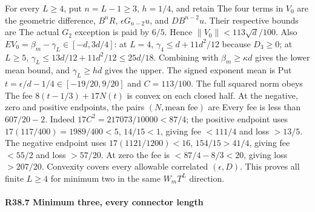 For every \(L\ge4\), put \(n=L-1\ge3\), \(h=1/4\), and retain
The four terms in \(V_0\) are the geometric difference, \(B^nR\), \(\epsilon G_{n-2}u\), and \(DB^{n-2}u\). Their respective bounds are
The actual \(G_2\) exception is paid by \(6/5\). Hence \(\|V_0\|<113\sqrt d/100\). Also \(EV_0=\beta_m-\gamma_L\in[-d,\allowbreak 3d/4]\): at \(L=4\), \(\gamma_4\le d+11d^2/12\) because \(D_3\ge0\); at \(L\ge5\), \(\gamma_L\le13d/12+11d^2/12\le25d/18\). Combining with \(\beta_m\ge\kappa d\) gives the lower mean bound, and \(\gamma_L\ge hd\) gives the upper. The signed exponent mean is
Put \(t=\epsilon/d-1/4\in[-19/20,\allowbreak 9/20]\) and \(C=113/100\). The full squared norm obeys
The fee \(8(t-1/3)+17N(t)\) is convex on each closed half. At the negative, zero and positive endpoints, the pairs \((N,\allowbreak \text{mean fee})\) are
Every fee is less than \(607/20-2\). Indeed \(17C^2=217073/10000<87/4\); the positive endpoint uses \(17(117/400)=1989/400<5\), \(14/15<1\), giving fee \(<111/4\) and loss \(>13/5\). The negative endpoint uses \(17(1121/1200)<16\), \(154/15>41/4\), giving fee \(<55/2\) and loss \(>57/20\). At zero the fee is \(<87/4-8/3<20\), giving loss \(>207/20\). Convexity covers every allowable correlated \((\epsilon,\allowbreak D)\). This proves all finite \(L\ge4\) for minimum two in the same \(W_mT^L\) direction.

\paragraph{R38.7 Minimum three, every connector length}\label{part:R38.7}

